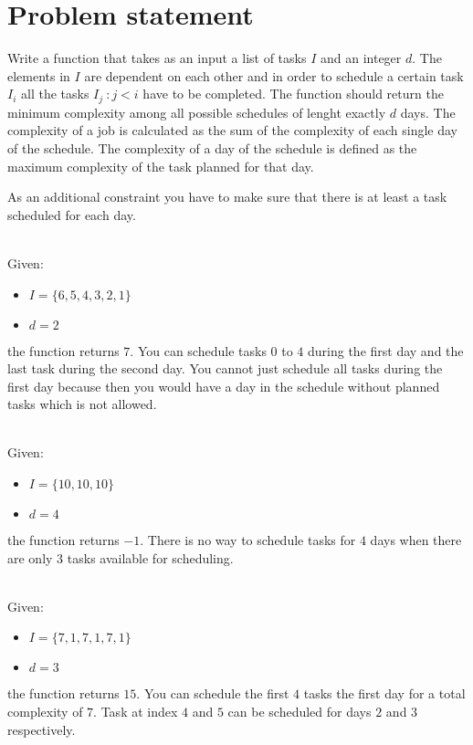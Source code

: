 \section{Problem statement}
\begin{exercise}
	Write a function that takes as an input a list of tasks $I$ and an integer $d$. The elements in
	$I$ are dependent on each other and in order to schedule a certain task $I_i$ all the tasks $I_j
	\: : j < i$ have to be completed. The function should return the minimum complexity among all
	possible schedules of lenght exactly $d$ days. The complexity of a job is calculated as the sum
	of the complexity of each single day of the schedule. The complexity of a day of the schedule is
	defined as the maximum complexity of the task planned for that day.

	As an additional constraint you have to make sure that there is at least a task scheduled for
	each day.
		
	\begin{example}
		\hfill \\
		Given:
		\begin{itemize}
			\item $I = \{6,5,4,3,2,1\}$
			\item $d = 2$
		\end{itemize}
		the function returns $7$. You can schedule tasks $0$ to $4$ during the first day and the
		last task during the second day. You cannot just schedule all tasks during the first day
		because then you would have a day in the schedule without planned tasks which is not
		allowed.
	\end{example}
	
	\begin{example}
		\hfill \\
		Given:
		\begin{itemize}
			\item $I = \{10,10,10\}$
			\item $d = 4$
		\end{itemize}
		the function returns $-1$. There is no way to schedule tasks for $4$ days when there are
		only $3$ tasks available for scheduling.
	\end{example}

		
	\begin{example}
		\hfill \\
		Given:
		\begin{itemize}
			\item $I = \{7,1,7,1,7,1\}$
			\item $d = 3$
		\end{itemize}
		the function returns $15$. You can schedule the first $4$ tasks the first day for a total
		complexity of $7$. Task at index $4$ and $5$ can be scheduled for days $2$ and $3$
		respectively. 


\end{example}
\end{exercise}

